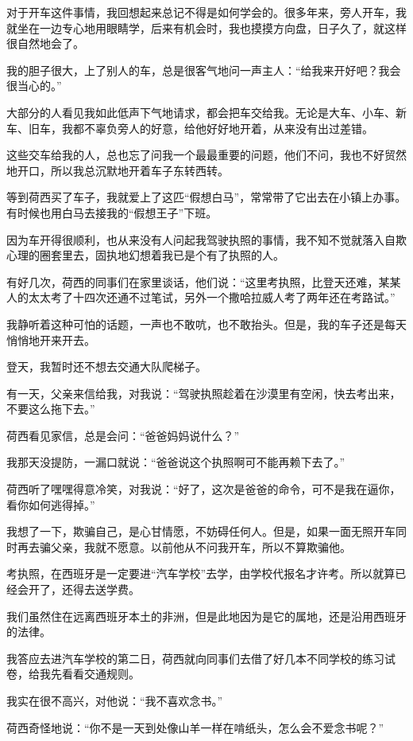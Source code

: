 \par 对于开车这件事情，我回想起来总记不得是如何学会的。很多年来，旁人开车，我就坐在一边专心地用眼睛学，后来有机会时，我也摸摸方向盘，日子久了，就这样很自然地会了。
\par 我的胆子很大，上了别人的车，总是很客气地问一声主人：“给我来开好吧？我会很当心的。”
\par 大部分的人看见我如此低声下气地请求，都会把车交给我。无论是大车、小车、新车、旧车，我都不辜负旁人的好意，给他好好地开着，从来没有出过差错。
\par 这些交车给我的人，总也忘了问我一个最最重要的问题，他们不问，我也不好贸然地开口，所以我总沉默地开着车子东转西转。
\par 等到荷西买了车子，我就爱上了这匹“假想白马”，常常带了它出去在小镇上办事。有时候也用白马去接我的“假想王子”下班。
\par 因为车开得很顺利，也从来没有人问起我驾驶执照的事情，我不知不觉就落入自欺心理的圈套里去，固执地幻想着我已是个有了执照的人。
\par 有好几次，荷西的同事们在家里谈话，他们说：“这里考执照，比登天还难，某某人的太太考了十四次还通不过笔试，另外一个撒哈拉威人考了两年还在考路试。”
\par 我静听着这种可怕的话题，一声也不敢吭，也不敢抬头。但是，我的车子还是每天悄悄地开来开去。
\par 登天，我暂时还不想去交通大队爬梯子。
\par 有一天，父亲来信给我，对我说：“驾驶执照趁着在沙漠里有空闲，快去考出来，不要这么拖下去。”
\par 荷西看见家信，总是会问：“爸爸妈妈说什么？”
\par 我那天没提防，一漏口就说：“爸爸说这个执照啊可不能再赖下去了。”
\par 荷西听了嘿嘿得意冷笑，对我说：“好了，这次是爸爸的命令，可不是我在逼你，看你如何逃得掉。”
\par 我想了一下，欺骗自己，是心甘情愿，不妨碍任何人。但是，如果一面无照开车同时再去骗父亲，我就不愿意。以前他从不问我开车，所以不算欺骗他。
\par 考执照，在西班牙是一定要进“汽车学校”去学，由学校代报名才许考。所以就算已经会开了，还得去送学费。
\par 我们虽然住在远离西班牙本土的非洲，但是此地因为是它的属地，还是沿用西班牙的法律。
\par 我答应去进汽车学校的第二日，荷西就向同事们去借了好几本不同学校的练习试卷，给我先看看交通规则。
\par 我实在很不高兴，对他说：“我不喜欢念书。”
\par 荷西奇怪地说：“你不是一天到处像山羊一样在啃纸头，怎么会不爱念书呢？”
